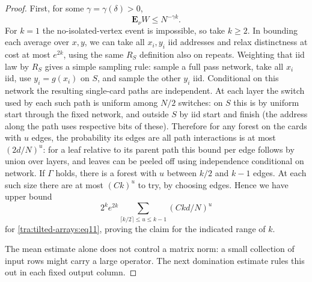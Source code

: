\begin{proof}
First, for some \(\gamma=\gamma(\delta)>0\),
\begin{equation}
 \mathbf E_\nu W\le N^{-\gamma k}. \label{tra:tilted-arrays:eq11}
\end{equation}
For \(k=1\) the no-isolated-vertex event is impossible, so take \(k\ge 2\). In bounding each average over \(x,y\), we can take all \(x_i,y_i\) iid addresses and relax distinctness at cost at most \(e^{2k}\), using the same \(R_S\) definition also on repeats. Weighting that iid law by \(R_S\) gives a simple sampling rule: sample a full pass network, take all \(x_i\) iid, use \(y_i=g(x_i)\) on \(S\), and sample the other \(y_i\) iid. Conditional on this network the resulting single-card paths are independent. At each layer the switch used by each such path is uniform among \(N/2\) switches: on \(S\) this is by uniform start through the fixed network, and outside \(S\) by iid start and finish (the address along the path uses respective bits of these). Therefore for any forest on the cards with \(u\) edges, the probability its edges are all path interactions is at most \((2d/N)^u\): for a leaf relative to its parent path this bound per edge follows by union over layers, and leaves can be peeled off using independence conditional on network. If \(\Gamma\) holds, there is a forest with \(u\) between \(k/2\) and \(k-1\) edges. At each such size there are at most \((C k)^u\) to try, by choosing edges. Hence we have upper bound
\[
 2^k e^{2k}\sum_{\lceil k/2\rceil\le u\le k-1}(C k d/N)^u
\]
for \eqref{tra:tilted-arrays:eq11}, proving the claim for the indicated range of \(k\).

The mean estimate alone does not control a matrix norm: a small collection of input rows might carry a large operator. The next domination estimate rules this out in each fixed output column.


\end{proof}
